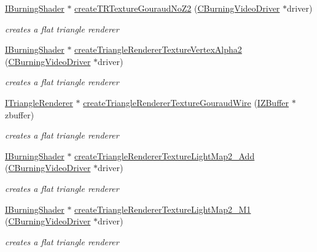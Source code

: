 \begin{DoxyCompactItemize}
\hyperlink{classirr_1_1video_1_1_i_burning_shader}{I\-Burning\-Shader} $\ast$ \hyperlink{namespaceirr_1_1video_ad1c00ba25d35a79e8497d2f49f1df871}{create\-T\-R\-Texture\-Gouraud\-No\-Z2} (\hyperlink{classirr_1_1video_1_1_c_burning_video_driver}{C\-Burning\-Video\-Driver} $\ast$driver)
\begin{DoxyCompactList}\small\item\em creates a flat triangle renderer \end{DoxyCompactList}\item 
\hyperlink{classirr_1_1video_1_1_i_burning_shader}{I\-Burning\-Shader} $\ast$ \hyperlink{namespaceirr_1_1video_ad1baaf969bce3367ec4db4f9c680d681}{create\-Triangle\-Renderer\-Texture\-Vertex\-Alpha2} (\hyperlink{classirr_1_1video_1_1_c_burning_video_driver}{C\-Burning\-Video\-Driver} $\ast$driver)
\begin{DoxyCompactList}\small\item\em creates a flat triangle renderer \end{DoxyCompactList}\item 
\hyperlink{classirr_1_1video_1_1_i_triangle_renderer}{I\-Triangle\-Renderer} $\ast$ \hyperlink{namespaceirr_1_1video_aab5dbd56767a46725de139892d440d84}{create\-Triangle\-Renderer\-Texture\-Gouraud\-Wire} (\hyperlink{classirr_1_1video_1_1_i_z_buffer}{I\-Z\-Buffer} $\ast$zbuffer)
\begin{DoxyCompactList}\small\item\em creates a flat triangle renderer \end{DoxyCompactList}\item 
\hyperlink{classirr_1_1video_1_1_i_burning_shader}{I\-Burning\-Shader} $\ast$ \hyperlink{namespaceirr_1_1video_af5624df435752c6e9f648f3b150fe9cf}{create\-Triangle\-Renderer\-Texture\-Light\-Map2\-\_\-\-Add} (\hyperlink{classirr_1_1video_1_1_c_burning_video_driver}{C\-Burning\-Video\-Driver} $\ast$driver)
\begin{DoxyCompactList}\small\item\em creates a flat triangle renderer \end{DoxyCompactList}\item 
\hyperlink{classirr_1_1video_1_1_i_burning_shader}{I\-Burning\-Shader} $\ast$ \hyperlink{namespaceirr_1_1video_ac2b9957460cdd8253e0e9c9f0fb417cf}{create\-Triangle\-Renderer\-Texture\-Light\-Map2\-\_\-\-M1} (\hyperlink{classirr_1_1video_1_1_c_burning_video_driver}{C\-Burning\-Video\-Driver} $\ast$driver)
\begin{DoxyCompactList}\small\item\em creates a flat triangle renderer \end{DoxyCompactList}\item 

\end{DoxyCompactItemize}
